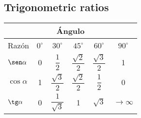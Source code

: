 \documentclass[11pt, a5paper]{article}
\begin{document}
\subsection*{Trigonometric ratios}
\begin{tabular}{l|ccccc}
	\multicolumn{6}{c}{Ángulo} \\
	\hline
	Razón & $0^{\circ}$ & $30^{\circ}$ & $45^{\circ}$ & $60^{\circ}$ & $90^{\circ}$ \\
	\hline
	$\sen \alpha$ & 0 & $\dfrac1{2}$ & $\dfrac{\sqrt{2}}{2}$ & $\dfrac{\sqrt{3}}{2}$ & 1 \\
	$\cos \alpha$ & 1 & $\dfrac{\sqrt{3}}{2}$ & $\dfrac{\sqrt{2}}{2}$ & $\dfrac1{2}$ & 0 \\
	$\tg \alpha$ & 0 & $\dfrac1{\sqrt{3}}$ & 1 & $\sqrt{3}$ & $\to \infty$  \\
\end{tabular}
\end{document}
